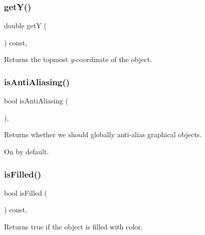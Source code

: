 \subsubsection{\texorpdfstring{get\+Y()}{getY()}}
{\footnotesize\ttfamily double getY (\begin{DoxyParamCaption}{ }\end{DoxyParamCaption}) const\hspace{0.3cm}{\ttfamily [virtual]}, {\ttfamily [inherited]}}



Returns the topmost {\itshape y}-\/coordinate of the object. 

\mbox{\label{classGObject_a93be0e1fe1b1bf1a1da732470c94f42b}} 
\subsubsection{\texorpdfstring{is\+Anti\+Aliasing()}{isAntiAliasing()}}
{\footnotesize\ttfamily bool is\+Anti\+Aliasing (\begin{DoxyParamCaption}{ }\end{DoxyParamCaption})\hspace{0.3cm}{\ttfamily [static]}, {\ttfamily [inherited]}}



Returns whether we should globally anti-\/alias graphical objects. 

On by default. \mbox{\label{classGObject_a11c404f106940c201b6f326e0355c150}} 
\subsubsection{\texorpdfstring{is\+Filled()}{isFilled()}}
{\footnotesize\ttfamily bool is\+Filled (\begin{DoxyParamCaption}{ }\end{DoxyParamCaption}) const\hspace{0.3cm}{\ttfamily [virtual]}, {\ttfamily [inherited]}}



Returns {\ttfamily true} if the object is filled with color. 

\mbox{\label{classGObject_a9de207581cfa4ca1eaa06da5f29b75fc}} 
